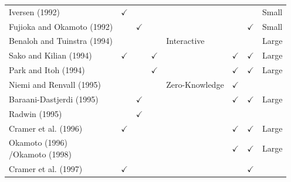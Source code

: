 \documentclass[../access.tex]{subfiles}
\begin{document}
\begin{table}[htbp]
\begin{adjustwidth}{-2cm}{}
\begin{tabular}
                    {} & {} & {} & {} & {} & {} & {} & {} \\
                    \hline
                    \footnotesize{Iversen (1992) \cite{Iversen1992}} & $ \checkmark $ & {} & {} & {} & {} & {} & \footnotesize{Small} \\
                    \hline
                    \footnotesize{Fujioka and Okamoto (1992) \cite{Fujioka1992}} & {} & $ \checkmark $ & {} & {} & {} & $ \checkmark $ & \footnotesize{Small} \\
                    \hline
                    \footnotesize{Benaloh and Tuinstra (1994) \cite{Benaloh1994}} & {} & {} & {} & \footnotesize{Interactive} & {} & {} & \footnotesize{Large} \\
                    \hline
                    \footnotesize{Sako and Kilian (1994) \cite{Sako1994}} & $ \checkmark $ & {} & $ \checkmark $ & {} & $ \checkmark $ & $ \checkmark $ & \footnotesize{Large} \\
                    \hline
                    \footnotesize{Park and Itoh (1994) \cite{Park1994}} & {} & {} & $ \checkmark $ & {} & $ \checkmark $ & $ \checkmark $ & \footnotesize{Large} \\
                    \hline
                    \footnotesize{Niemi and Renvall (1995) \cite{Niemi1995}} & {} & {} & {} & \parbox[c]{2.1cm}{\footnotesize{Zero-Knowledge}} & $ \checkmark $ & {} & {} \\
                    \hline
                    \footnotesize{Baraani-Dastjerdi (1995) \cite{Baraani1995}} & {} & $ \checkmark $ & {} & {} & $ \checkmark $ & $ \checkmark $ & \footnotesize{Large} \\
                    \hline
                    \footnotesize{Radwin (1995) \cite{Radwin1995}} & {} & $ \checkmark $ & {} & {} & {} & {} & {} \\
                    \hline
                    \footnotesize{Cramer et al. (1996) \cite{Cramer1996}} & $ \checkmark $ & {} & {} & {} & $ \checkmark $ & $ \checkmark $ & \footnotesize{Large} \\
                    \hline
                    \parbox[c]{3.2cm}{\footnotesize{Okamoto (1996) \cite{Okamoto1996}\\/Okamoto (1998) \cite{Okamoto1998}}} & {} & {} & {} & {} & $ \checkmark $ & $ \checkmark $ & \footnotesize{Large} \\
                    \hline
                    \footnotesize{Cramer et al. (1997) \cite{Cramer1997}} & $ \checkmark $ & {} & {} & {} & {} & $ \checkmark $ & {} \\

\end{tabular}
\end{adjustwidth}
\end{table}
\end{document}

